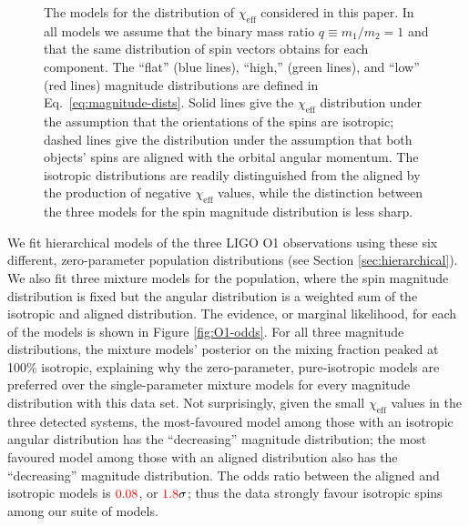 \documentclass[modern,linenumbers]{aastex61}
\newcommand{\chieff}{\chi_\mathrm{eff}}
\newcommand{\checkme}[1]{\textcolor{red}{#1}}
\newcommand{\OOneSigmaIsoAligned}{\checkme{1.8}}
\newcommand{\OOneOddsIsoAligned}{\checkme{0.08}}
\begin{document}
\begin{figure}
  \caption{\label{fig:chieff-distribution-models} The models for the
    distribution of $\chieff$ considered in this paper.  In all models
    we assume that the binary mass ratio $q \equiv m_1/m_2 = 1$ and
    that the same distribution of spin vectors obtains for each
    component.  The ``flat'' (blue lines), ``high,'' (green
    lines), and ``low'' (red lines) magnitude distributions are
    defined in Eq.\ \eqref{eq:magnitude-dists}.  Solid lines give the
    $\chieff$ distribution under the assumption that the orientations
    of the spins are isotropic; dashed lines give the distribution
    under the assumption that both objects' spins are aligned with the
    orbital angular momentum.  The isotropic distributions are readily
    distinguished from the aligned by the production of negative
    $\chieff$ values, while the distinction between the three models
    for the spin magnitude distribution is less sharp.}
\end{figure}

We fit hierarchical models of the three LIGO O1 observations using
these six different, zero-parameter population distributions (see
Section \ref{sec:hierarchical}).  We also fit three mixture models for
the population, where the spin magnitude distribution is fixed but the
angular distribution is a weighted sum of the isotropic and aligned
distribution.  The evidence, or marginal likelihood, for each of the
models is shown in Figure \ref{fig:O1-odds}.  For all three magnitude
distributions, the mixture models' posterior on the mixing fraction
peaked at 100\% isotropic, explaining why the zero-parameter,
pure-isotropic models are preferred over the single-parameter mixture
models for every magnitude distribution with this data set.  Not
surprisingly, given the small $\chieff$ values in the three detected
systems, the most-favoured model among those with an isotropic angular
distribution has the ``decreasing'' magnitude distribution; the most
favoured model among those with an aligned distribution also has the
``decreasing'' magnitude distribution.  The odds ratio between the
aligned and isotropic models is $\OOneOddsIsoAligned$, or
$\OOneSigmaIsoAligned\sigma$; thus the data strongly favour isotropic
spins among our suite of models.
\end{document}
